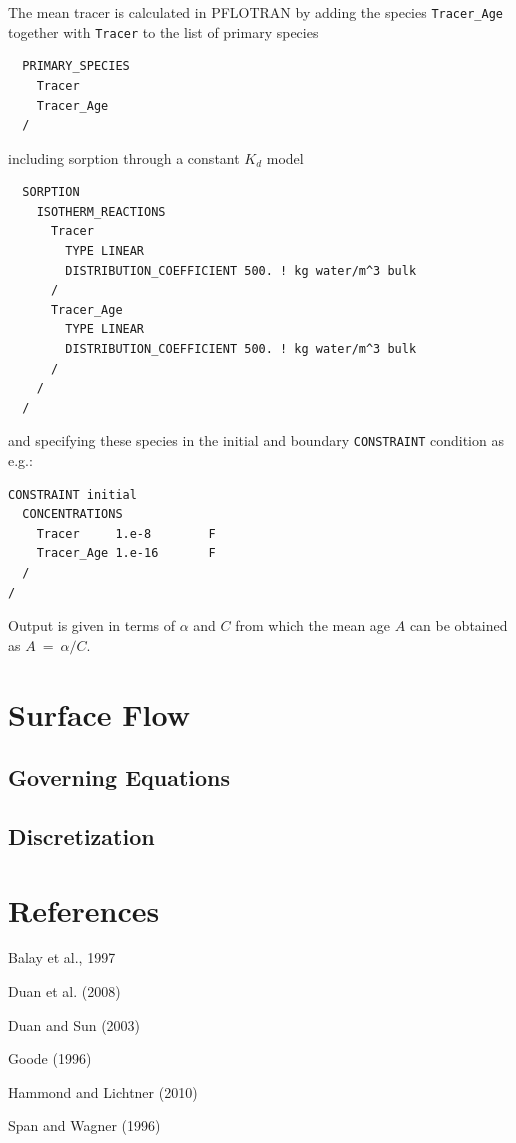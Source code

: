 \documentclass[12pt]{article}
\newcommand{\eq}{\ =\ }
\begin{document}
The mean tracer is calculated in PFLOTRAN by adding the species {\tt Tracer\_Age} together with {\tt Tracer} to the list of primary species
\begin{verbatim}
  PRIMARY_SPECIES
    Tracer
    Tracer_Age
  /
\end{verbatim}
including sorption through a constant $K_d$ model
\begin{verbatim}
  SORPTION
    ISOTHERM_REACTIONS
      Tracer
        TYPE LINEAR 
        DISTRIBUTION_COEFFICIENT 500. ! kg water/m^3 bulk
      /
      Tracer_Age
        TYPE LINEAR 
        DISTRIBUTION_COEFFICIENT 500. ! kg water/m^3 bulk
      /
    /
  /
\end{verbatim}
and specifying these species in the initial and boundary {\tt CONSTRAINT} condition as e.g.:
\begin{verbatim}
CONSTRAINT initial
  CONCENTRATIONS
    Tracer     1.e-8        F
    Tracer_Age 1.e-16       F
  /
/
\end{verbatim}
Output is given in terms of $\alpha$ and $C$ from which the mean age $A$ can be obtained as $A\eq\alpha/C$. 


\section{Surface Flow}

\subsection{Governing Equations}

\subsection{Discretization}


\section{References}

\begin{description}
\item Balay et al., 1997

\item Duan et al. (2008)

\item Duan and Sun (2003)

\item Goode (1996)

\item Hammond and Lichtner (2010)

\item Span and Wagner (1996)

\end{description}
\end{document}
